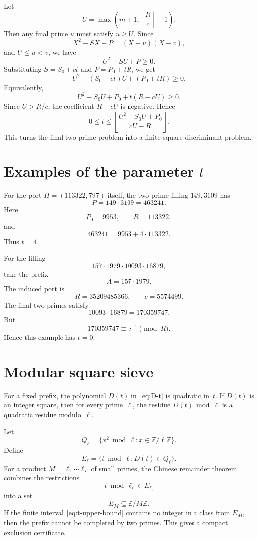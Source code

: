 \documentclass[11pt]{amsart}
\theoremstyle{plain}
\theoremstyle{definition}
\theoremstyle{remark}
\newcommand{\Z}{\mathbb Z}
\begin{document}
Let
\[
        U=\max\left(m+1,\left\lfloor\frac Rc\right\rfloor+1\right).
\]
Then any final prime $u$ must satisfy $u\ge U$.  Since
\[
        X^2-SX+P=(X-u)(X-v),
\]
and $U\le u<v$, we have
\[
        U^2-SU+P\ge0.
\]
Substituting $S=S_0+ct$ and $P=P_0+tR$, we get
\[
        U^2-(S_0+ct)U+(P_0+tR)\ge0.
\]
Equivalently,
\[
        U^2-S_0U+P_0+t(R-cU)\ge0.
\]
Since $U>R/c$, the coefficient $R-cU$ is negative.  Hence
\begin{equation}\label{eq:t-upper-bound}
        \boxed{
        0\le t\le
        \left\lfloor
        \frac{U^2-S_0U+P_0}{cU-R}
        \right\rfloor.
        }
\end{equation}
This turns the final two-prime problem into a finite square-discriminant problem.

\section{Examples of the parameter \texorpdfstring{$t$}{t}}

For the port $H=(113322,797)$ itself, the two-prime filling $149,3109$ has
\[
        P=149\cdot3109=463241.
\]
Here
\[
        P_0=9953,
        \qquad
        R=113322,
\]
and
\[
        463241=9953+4\cdot113322.
\]
Thus $t=4$.

For the filling
\[
        157\cdot1979\cdot10093\cdot16879,
\]
take the prefix
\[
        A=157\cdot1979.
\]
The induced port is
\[
        R=35209485366,
        \qquad
        c=5574499.
\]
The final two primes satisfy
\[
        10093\cdot16879=170359747.
\]
But
\[
        170359747\equiv c^{-1}\pmod R.
\]
Hence this example has $t=0$.

\section{Modular square sieve}

For a fixed prefix, the polynomial $D(t)$ in~\eqref{eq:D-t} is quadratic in~$t$.  If $D(t)$ is an integer square, then for every prime~$\ell$, the residue $D(t)\bmod\ell$ is a quadratic residue modulo~$\ell$.

Let
\[
        Q_\ell=\{x^2\bmod\ell:x\in\Z/\ell\Z\}.
\]
Define
\[
        E_\ell=\{t\bmod\ell:D(t)\in Q_\ell\}.
\]
For a product $M=\ell_1\cdots\ell_s$ of small primes, the Chinese remainder theorem combines the restrictions
\[
        t\bmod\ell_i\in E_{\ell_i}
\]
into a set
\[
        E_M\subseteq\Z/M\Z.
\]
If the finite interval~\eqref{eq:t-upper-bound} contains no integer in a class from $E_M$, then the prefix cannot be completed by two primes.  This gives a compact exclusion certificate.
\end{document}
